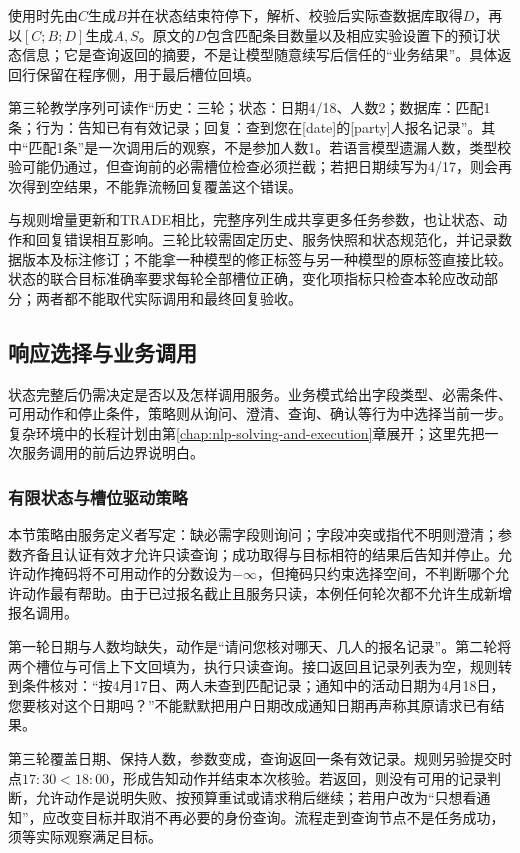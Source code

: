 使用时先由$C$生成$B$并在状态结束符停下，解析、校验后实际查数据库取得$D$，再以$[C;B;D]$生成$A,S$。原文的$D$包含匹配条目数量以及相应实验设置下的预订状态信息；它是查询返回的摘要，不是让模型随意续写后信任的“业务结果”。具体返回行保留在程序侧，用于最后槽位回填。

第三轮教学序列可读作“历史：三轮；状态：日期4/18、人数2；数据库：匹配1条；行为：告知已有有效记录；回复：查到您在[date]的[party]人报名记录”。其中“匹配1条”是一次调用后的观察，不是参加人数1。若语言模型遗漏人数，类型校验可能仍通过，但查询前的必需槽位检查必须拦截；若把日期续写为4/17，则会再次得到空结果，不能靠流畅回复覆盖这个错误。

与规则增量更新和TRADE相比，完整序列生成共享更多任务参数，也让状态、动作和回复错误相互影响。三轮比较需固定历史、服务快照和状态规范化，并记录数据版本及标注修订；不能拿一种模型的修正标签与另一种模型的原标签直接比较。状态的联合目标准确率要求每轮全部槽位正确，变化项指标只检查本轮应改动部分；两者都不能取代实际调用和最终回复验收。

\subsection{响应选择与业务调用}
\label{sec:nlp-dialogue-action}

状态完整后仍需决定是否以及怎样调用服务。业务模式给出字段类型、必需条件、可用动作和停止条件，策略则从询问、澄清、查询、确认等行为中选择当前一步。复杂环境中的长程计划由第\ref{chap:nlp-solving-and-execution}章展开；这里先把一次服务调用的前后边界说明白。

\subsubsection{有限状态与槽位驱动策略}
\label{sec:nlp-dialogue-rule-policy}

本节策略由服务定义者写定：缺必需字段则询问；字段冲突或指代不明则澄清；参数齐备且认证有效才允许只读查询；成功取得与目标相符的结果后告知并停止。允许动作掩码将不可用动作的分数设为$-\infty$，但掩码只约束选择空间，不判断哪个允许动作最有帮助。由于已过报名截止且服务只读，本例任何轮次都不允许生成新增报名调用。

第一轮日期与人数均缺失，动作是“请问您核对哪天、几人的报名记录”。第二轮将两个槽位与可信上下文回填为，执行只读查询。接口返回且记录列表为空，规则转到条件核对：“按4月17日、两人未查到匹配记录；通知中的活动日期为4月18日，您要核对这个日期吗？”不能默默把用户日期改成通知日期再声称其原请求已有结果。

第三轮覆盖日期、保持人数，参数变成，查询返回一条有效记录。规则另验提交时点$17{:}30<18{:}00$，形成告知动作并结束本次核验。若返回，则没有可用的记录判断，允许动作是说明失败、按预算重试或请求稍后继续；若用户改为“只想看通知”，应改变目标并取消不再必要的身份查询。流程走到查询节点不是任务成功，须等实际观察满足目标。

